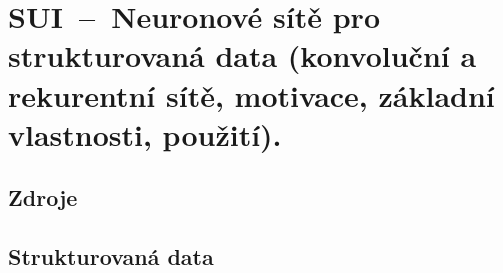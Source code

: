 

\graphicspath{{sui/neuronove_site_pro_strukturovana_data/figures}}


\chapter{SUI~--~Neuronové sítě pro strukturovaná data (konvoluční a rekurentní sítě, motivace, základní vlastnosti, použití).}


\section{Zdroje}

\begin{compactitem}
    \item {}
    \item {}
    \item {}
    \item {}
\end{compactitem}


\section{Strukturovaná data}

